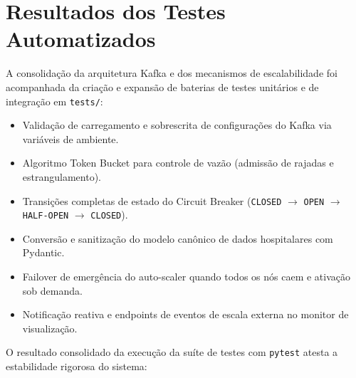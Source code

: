 \documentclass[11pt,a4paper]{article}
\begin{document}
\section{Resultados dos Testes Automatizados}

A consolidação da arquitetura Kafka e dos mecanismos de escalabilidade foi acompanhada da criação e expansão de baterias de testes unitários e de integração em \texttt{tests/}:
\begin{itemize}
    \item Validação de carregamento e sobrescrita de configurações do Kafka via variáveis de ambiente.
    \item Algoritmo Token Bucket para controle de vazão (admissão de rajadas e estrangulamento).
    \item Transições completas de estado do Circuit Breaker (\texttt{CLOSED} $\to$ \texttt{OPEN} $\to$ \texttt{HALF-OPEN} $\to$ \texttt{CLOSED}).
    \item Conversão e sanitização do modelo canônico de dados hospitalares com Pydantic.
    \item Failover de emergência do auto-scaler quando todos os nós caem e ativação sob demanda.
    \item Notificação reativa e endpoints de eventos de escala externa no monitor de visualização.
\end{itemize}

O resultado consolidado da execução da suíte de testes com \texttt{pytest} atesta a estabilidade rigorosa do sistema:
\end{document}
